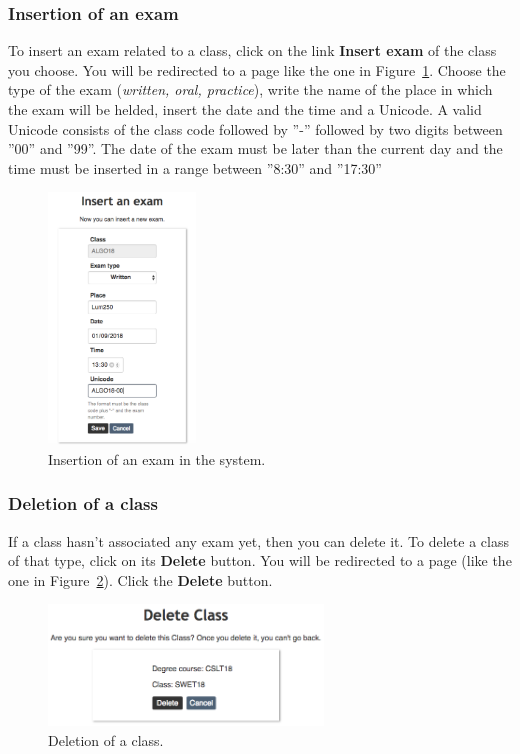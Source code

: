 \subsubsection{Insertion of an exam} \label{sssec:exaIns}
To insert an exam related to a class, click on the link \textbf{Insert exam} of the class you choose. You will be redirected to a page like the one in Figure~\ref{fig:insertExam}. Choose the type of the exam (\emph{written, oral, practice}), write the name of the place in which the exam will be helded, insert the date and the time and a Unicode. A valid Unicode consists of the class code followed by ''-'' followed by two digits between ''00'' and ''99''. The date of the exam must be later than the current day and the time must be inserted in a range between ''8:30'' and ''17:30''
\begin{figure}[H]
	\centering
	\includegraphics[width=0.35\textwidth]{img/insertExam.png}
	\caption{Insertion of an exam in the system.}
	\label{fig:insertExam}
\end{figure}

\subsubsection{Deletion of a class}
If a class hasn't associated any exam yet, then you can delete it. To delete a class of that type, click on its \textbf{Delete} button. You will be redirected to a page (like the one in Figure~\ref{fig:deleteClass}). Click the \textbf{Delete} button.%
\begin{figure}[H]
	\centering
	\includegraphics[width=0.65\textwidth]{img/deleteClass.png}
	\caption{Deletion of a class.}
	\label{fig:deleteClass}
\end{figure}

